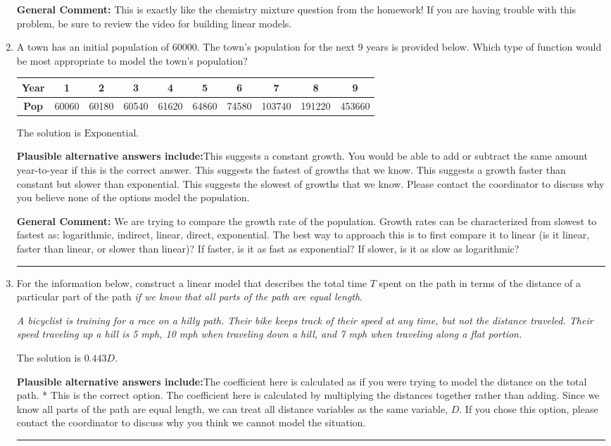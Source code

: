 \documentclass{extbook}[14pt]
\newcommand{\litem}[1]{\item #1

\rule{\textwidth}{0.4pt}}
\begin{document}
\begin{enumerate}
{\textbf{General Comment:} This is exactly like the chemistry mixture question from the homework! If you are having trouble with this problem, be sure to review the video for building linear models.
}
\litem{
A town has an initial population of 60000. The town's population for the next 9 years is provided below. Which type of function would be most appropriate to model the town's population?


\begin{tabular}{c|c|c|c|c|c|c|c|c|c}
\textbf{Year} &1 &2 &3 &4 &5 &6 &7 &8 &9\tabularnewline \hline
\textbf{Pop} &60060 &60180 &60540 &61620 &64860 &74580 &103740 &191220 &453660\end{tabular}The solution is \( \text{Exponential} \).\begin{enumerate}[label=\Alph*.]
\textbf{Plausible alternative answers include:}This suggests a constant growth. You would be able to add or subtract the same amount year-to-year if this is the correct answer.
This suggests the fastest of growths that we know.
This suggests a growth faster than constant but slower than exponential.
This suggests the slowest of growths that we know.
Please contact the coordinator to discuss why you believe none of the options model the population.
\end{enumerate}

\textbf{General Comment:} We are trying to compare the growth rate of the population. Growth rates can be characterized from slowest to fastest as: logarithmic, indirect, linear, direct, exponential. The best way to approach this is to first compare it to linear (is it linear, faster than linear, or slower than linear)? If faster, is it as fast as exponential? If slower, is it as slow as logarithmic?
}
\litem{
For the information below, construct a linear model that describes the total time $T$ spent on the path in terms of the distance of a particular part of the path \textit{if we know that all parts of the path are equal length}.

\begin{center}
    \textit{ A bicyclist is training for a race on a hilly path. Their bike keeps track of their speed at any time, but not the distance traveled. Their speed traveling up a hill is 5 mph, 10 mph when traveling down a hill, and 7 mph when traveling along a flat portion. }
\end{center}
The solution is \( 0.443 D \).\begin{enumerate}[label=\Alph*.]
\textbf{Plausible alternative answers include:}The coefficient here is calculated as if you were trying to model the distance on the total path.
* This is the correct option.
The coefficient here is calculated by multiplying the distances together rather than adding.
Since we know all parts of the path are equal length, we can treat all distance variables as the same variable, $D$.
If you chose this option, please contact the coordinator to discuss why you think we cannot model the situation.
\end{enumerate}

}
\end{enumerate}
\end{document}
